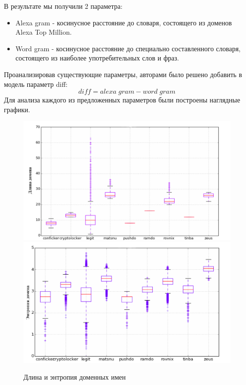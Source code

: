 В результате мы получили 2 параметра:
    \begin{itemize}
    \item Alexa gram - косинусное расстояние до словаря, состоящего из доменов Alexa Top Million.
    \item Word gram - косинусное расстояние до специально составленного словаря, состоящего из наиболее употребительных слов и фраз.
    \end{itemize}
    Проанализировав существующие параметры, авторами было решено добавить в модель параметр diff:
    \begin{equation}
    diff = alexa\;gram-word\;gram
    \end{equation}
    Для анализа каждого из предложенных параметров были построены наглядные графики.
    \begin{figure}[H]
        \left
        \includegraphics[width=0.5\linewidth]{images/linear_class/length.png}
        \right
        \includegraphics[width=0.5\linewidth]{images/linear_class/entropy.png} \label{length_entropy}
        \caption{Длина и энтропия доменных имен}
    \end{figure}
